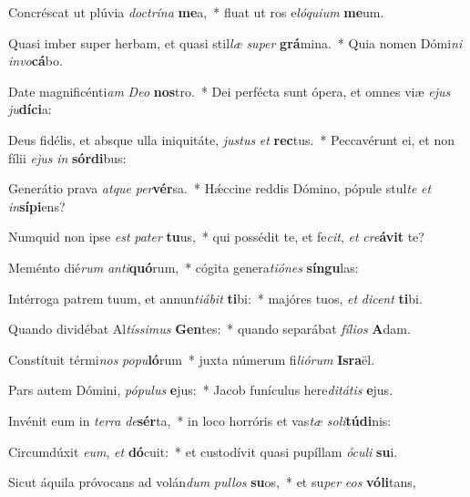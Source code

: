 \item Concréscat ut plúvia \textit{doc}\textit{trí}\textit{na} \textbf{me}a,~* fluat ut ros e\textit{ló}\textit{qui}\textit{um} \textbf{me}um.
\item Quasi imber super herbam, et quasi stil\textit{læ} \textit{su}\textit{per} \textbf{grá}mina.~* Quia nomen Dómi\textit{ni} \textit{in}\textit{vo}\textbf{cá}bo.
\item Date magnificénti\textit{am} \textit{De}\textit{o} \textbf{nos}tro.~* Dei perfécta sunt ópera, et omnes viæ \textit{e}\textit{jus} \textit{ju}\textbf{dí}\textbf{ci}a:
\item Deus fidélis, et absque ulla iniquitáte, \textit{jus}\textit{tus} \textit{et} \textbf{rec}tus.~* Peccavérunt ei, et non fílii \textit{e}\textit{jus} \textit{in} \textbf{sór}\textbf{di}bus:
\item Generátio prava \textit{at}\textit{que} \textit{per}\textbf{vér}sa.~* Hǽccine reddis Dómino, pópule stul\textit{te} \textit{et} \textit{in}\textbf{sí}\textbf{pi}ens?
\item Numquid non ipse \textit{est} \textit{pa}\textit{ter} \textbf{tu}us,~* qui possédit te, et fe\textit{cit}, \textit{et} \textit{cre}\textbf{á}\textbf{vit} te?
\item Meménto dié\textit{rum} \textit{an}\textit{ti}\textbf{quó}rum,~* cógita genera\textit{ti}\textit{ó}\textit{nes} \textbf{sín}\textbf{gu}las:
\item Intérroga patrem tuum, et annun\textit{ti}\textit{á}\textit{bit} \textbf{ti}bi:~* majóres tuos, \textit{et} \textit{di}\textit{cent} \textbf{ti}bi.
\item Quando dividébat Al\textit{tís}\textit{si}\textit{mus} \textbf{Gen}tes:~* quando separábat \textit{fí}\textit{li}\textit{os} \textbf{A}dam.
\item Constítuit térmi\textit{nos} \textit{po}\textit{pu}\textbf{ló}rum~* juxta númerum fi\textit{li}\textit{ó}\textit{rum} \textbf{Is}\textbf{ra}ël.
\item Pars autem Dómini, \textit{pó}\textit{pu}\textit{lus} \textbf{e}jus:~* Jacob funículus here\textit{di}\textit{tá}\textit{tis} \textbf{e}jus.
\item Invénit eum in \textit{ter}\textit{ra} \textit{de}\textbf{sér}ta,~* in loco horróris et vas\textit{tæ} \textit{so}\textit{li}\textbf{tú}\textbf{di}nis:
\item Circumdúxit \textit{e}\textit{um}, \textit{et} \textbf{dó}cuit:~* et custodívit quasi pupíllam \textit{ó}\textit{cu}\textit{li} \textbf{su}i.
\item Sicut áquila próvocans ad volán\textit{dum} \textit{pul}\textit{los} \textbf{su}os,~* et su\textit{per} \textit{e}\textit{os} \textbf{vó}\textbf{li}tans,
